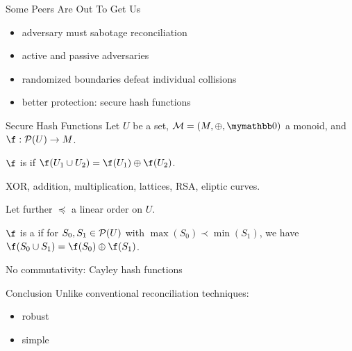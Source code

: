 \documentclass{beamer}
\begin{document}
\begin{frame}{Some Peers Are Out To Get Us}
    \begin{itemize}
        \item adversary must sabotage reconciliation
        \item<2-> active and passive adversaries
        \item<3-> randomized boundaries defeat individual collisions 
        \item<4-> better protection: secure hash functions
    \end{itemize}
\end{frame}

\begin{frame}{Secure Hash Functions}
    Let $U$ be a set, $\mathcal{M} = (M, \groupaddsym, \neutraladd)$ a monoid, and $\fun{\f}{\powerset{U}}{M}$.

    $\f$ is  if $\f(U_1 \cup U_2) = \f(U_1) \groupaddsym \f(U_2)$.\pause

    XOR, addition, multiplication, lattices, RSA, eliptic curves.\pause

    \vfill

    Let further $\preceq$ a linear order on $U$.
	
	$\f$ is a  if for $S_0, S_1 \in \mathcal{P}({U})$ with $\max(S_0) \prec \min(S_1)$, we have $\f(S_0 \cup S_1) = \groupadd{\f(S_0)}{\f(S_1)}$.

    \vfill

    No commutativity: Cayley hash functions
\end{frame}

\begin{frame}{Conclusion}
    Unlike conventional reconciliation techniques:
    \begin{itemize}
        \item robust
        \item simple
    \end{itemize}
\end{frame}
\end{document}

